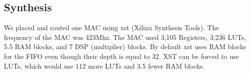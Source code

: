 \subsection{Synthesis}
We placed and routed one MAC using xst (Xilinx Synthesis Tools). The frequency of the MAC was 423Mhz. The MAC used 3,105 Registers, 3,236 LUTs, 5.5 RAM blocks, and 7 DSP (multiplier) blocks. By default xst uses RAM blocks for the FIFO even though their depth is equal to 32. XST can be forced to use LUTs, which would use 112 more LUTs and 3.5 fewer RAM blocks.
